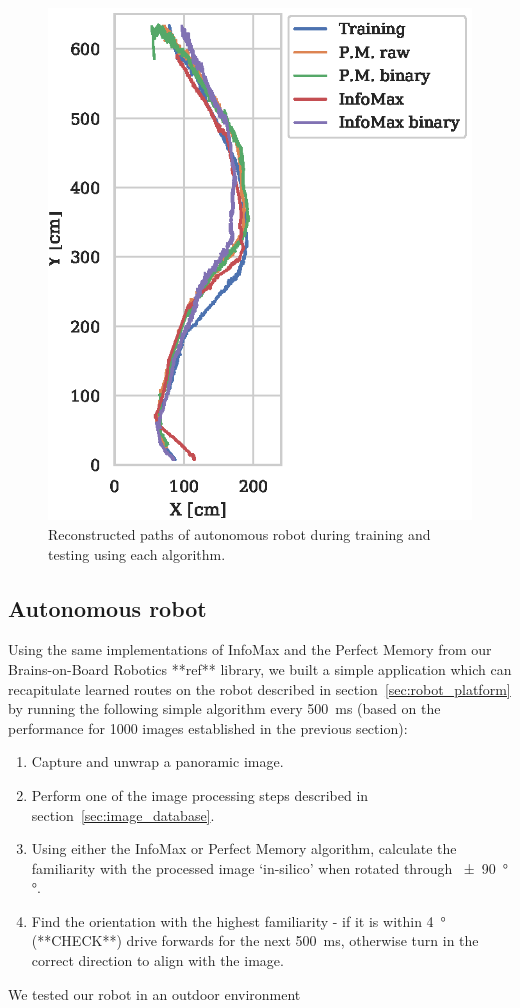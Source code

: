 \documentclass[letterpaper]{article}
\begin{document}
\begin{figure}[t]
    \centering
    \includegraphics{figures/robot_paths.eps}
    \caption{Reconstructed paths of autonomous robot during training and testing using each algorithm.}
    \label{fig:robot_paths}
\end{figure}


\subsection{Autonomous robot}
Using the same implementations of InfoMax and the Perfect Memory from our Brains-on-Board Robotics **ref** library, we built a simple application which can recapitulate learned routes on the robot described in section~\ref{sec:robot_platform} by running the following simple algorithm every \SI{500}{\milli\second} (based on the performance for 1000 images established in the previous section):
\begin{enumerate}
    \item Capture and unwrap a panoramic image.
    \item Perform one of the image processing steps described in section~\ref{sec:image_database}.
    \item Using either the InfoMax or Perfect Memory algorithm, calculate the familiarity with the processed image ‘in-silico’ when rotated through \SI{\pm 90}{\degree}°.
    \item Find the orientation with the highest familiarity - if it is within \SI{4}{\degree} (**CHECK**) drive forwards for the next \SI{500}{\milli\second}, otherwise turn in the correct direction to align with the image.
\end{enumerate}
We tested our robot in an outdoor environment 
\end{document}
